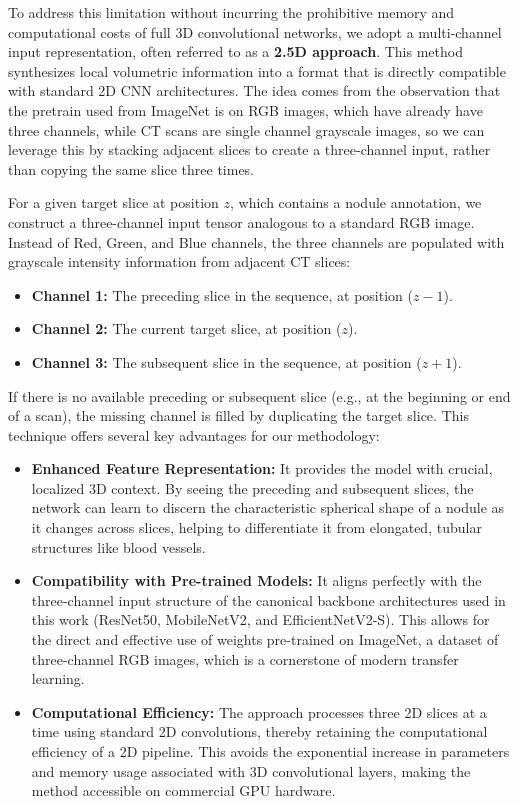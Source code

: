 To address this limitation without incurring the prohibitive memory and computational costs of full 3D convolutional networks, we adopt a multi-channel input representation, often referred to as a \textbf{2.5D approach}. This method synthesizes local volumetric information into a format that is directly compatible with standard 2D CNN architectures.
The idea comes from the observation that the pretrain used from ImageNet is on RGB images, which have already have three channels, while CT scans are single channel grayscale images, so we can leverage this by stacking adjacent slices to create a three-channel input, rather than copying the same slice three times.

For a given target slice at position $z$, which contains a nodule annotation, we construct a three-channel input tensor analogous to a standard RGB image. Instead of Red, Green, and Blue channels, the three channels are populated with grayscale intensity information from adjacent CT slices:

\begin{itemize}
    \item \textbf{Channel 1:} The preceding slice in the sequence, at position ($z-1$).
    \item \textbf{Channel 2:} The current target slice, at position ($z$).
    \item \textbf{Channel 3:} The subsequent slice in the sequence, at position ($z+1$).
\end{itemize}
If there is no available preceding or subsequent slice (e.g., at the beginning or end of a scan), the missing channel is filled by duplicating the target slice.
This technique offers several key advantages for our methodology:

\begin{itemize}
    \item \textbf{Enhanced Feature Representation:} It provides the model with crucial, localized 3D context. By seeing the preceding and subsequent slices, the network can learn to discern the characteristic spherical shape of a nodule as it changes across slices, helping to differentiate it from elongated, tubular structures like blood vessels.

    \item \textbf{Compatibility with Pre-trained Models:} It aligns perfectly with the three-channel input structure of the canonical backbone architectures used in this work (ResNet50, MobileNetV2, and EfficientNetV2-S). This allows for the direct and effective use of weights pre-trained on ImageNet, a dataset of three-channel RGB images, which is a cornerstone of modern transfer learning.

    \item \textbf{Computational Efficiency:} The approach processes three 2D slices at a time using standard 2D convolutions, thereby retaining the computational efficiency of a 2D pipeline. This avoids the exponential increase in parameters and memory usage associated with 3D convolutional layers, making the method accessible on commercial GPU hardware.
\end{itemize}

